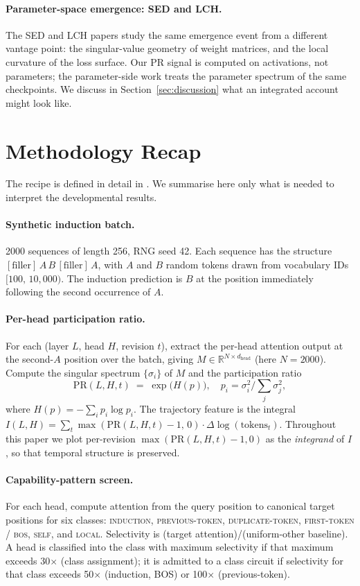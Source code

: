 \documentclass[11pt]{article}
\newcommand{\prtxt}{\mathrm{PR}}
\begin{document}
\paragraph{Parameter-space emergence: SED and LCH.}
The SED \citep{xu2026sed} and LCH \citep{xu2026lch} papers study the same
emergence event from a different vantage point: the singular-value
geometry of weight matrices, and the local curvature of the loss surface.
Our PR signal is computed on activations, not parameters; the parameter-side
work treats the parameter spectrum of the same checkpoints. We discuss in
Section~\ref{sec:discussion} what an integrated account might look like.

\section{Methodology Recap}
\label{sec:method}

The recipe is defined in detail in \citet{paper1_methodology}. We summarise
here only what is needed to interpret the developmental results.

\paragraph{Synthetic induction batch.} 2000 sequences of length 256, RNG
seed 42. Each sequence has the structure $[\text{filler}]\,A\,B\,
[\text{filler}]\,A$, with $A$ and $B$ random tokens drawn from vocabulary
IDs $[100,\,10{,}000)$. The induction prediction is $B$ at the position
immediately following the second occurrence of $A$.

\paragraph{Per-head participation ratio.} For each (layer $L$, head $H$,
revision $t$), extract the per-head attention output at the second-$A$
position over the batch, giving $M \in \mathbb{R}^{N \times d_\text{head}}$
(here $N=2000$). Compute the singular spectrum $\{\sigma_i\}$ of $M$ and
the participation ratio
\[
  \prtxt(L,H,t) \;=\; \exp\!\big(H(p)\big),
  \quad p_i = \sigma_i^2 / \textstyle\sum_j \sigma_j^2,
\]
where $H(p)=-\sum_i p_i \log p_i$. The trajectory feature is the integral
$I(L,H) = \sum_t \max(\prtxt(L,H,t)-1,\,0)\cdot\Delta \log(\text{tokens}_t)$.
Throughout this paper we plot per-revision $\max(\prtxt(L,H,t)-1,0)$ as the
\emph{integrand} of $I$, so that temporal structure is preserved.

\paragraph{Capability-pattern screen.} For each head, compute attention
from the query position to canonical target positions for six classes:
\textsc{induction}, \textsc{previous-token}, \textsc{duplicate-token},
\textsc{first-token / bos}, \textsc{self}, and \textsc{local}. Selectivity
is (target attention)/(uniform-other baseline). A head is classified into
the class with maximum selectivity if that maximum exceeds 30$\times$
(class assignment); it is admitted to a class circuit if selectivity for
that class exceeds 50$\times$ (induction, BOS) or 100$\times$
(previous-token).
\end{document}
